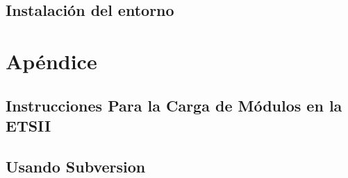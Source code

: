 \documentclass[11pt,a4paper,oneside,onecolumn]{book}
\begin{document}
\chapter{Instalación del entorno}
\label{chapter:ejecuciondeprogramas}



\part*{Apéndice}

\chapter*{Instrucciones Para la Carga de Módulos en la ETSII}
\label{apendice:modulosetsii}
 

\chapter*{Usando Subversion}
 
\end{document}
